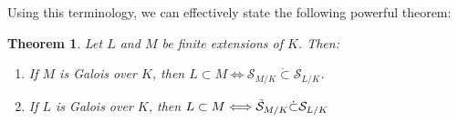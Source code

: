 \documentclass{article}
\theoremstyle{plain}
\newtheorem{thm}{Theorem}
\theoremstyle{definition}
\theoremstyle{remark}
\numberwithin{equation}{section}
\numberwithin{thm}{section}
\begin{document}
Using this terminology, we can effectively state the following powerful theorem:

\begin{thm} \label{8.4}
Let $L$ and $M$ be finite extensions of $K$. Then:

\begin{enumerate}

    \item If $M$ is Galois over $K$, then $L \subset M \Longleftrightarrow \mathcal{S}_{M/K} \dot{\subset} \mathcal{S}_{L/K}$.

    \item If $L$ is Galois over $K$, then $L \subset M \Longleftrightarrow \Tilde{\mathcal{S}}_{M/K} \dot{\subset} \mathcal{S}_{L/K}$
    
\end{enumerate}

\end{thm}
\end{document}
